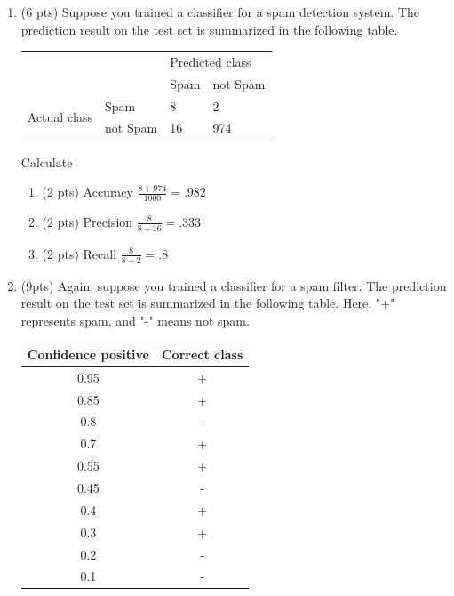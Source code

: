 \documentclass[a4paper]{article}
\theoremstyle{definition}
\newenvironment{soln}{
    \leavevmode\color{blue}\ignorespaces
}{}
\begin{document}
\begin{enumerate}
\begin{enumerate}
\end{enumerate}

\item (6 pts) Suppose you trained a classifier for a spam detection system. The prediction result on the test set is summarized in the following table.
\begin{center}
	\begin{tabular}{l l | l l}
		&          & \multicolumn{2}{l}{Predicted class} \\
		&          & Spam           & not Spam           \\
		\hline
		\multirow{2}{*}{Actual class} & Spam     & 8              & 2                  \\
		& not Spam & 16             & 974               
	\end{tabular}
\end{center}

Calculate
\begin{enumerate}
	\item (2 pts) Accuracy
	\begin{soln}  $\frac{8 + 974}{1000} = .982$ \end{soln}
	\item (2 pts) Precision
	\begin{soln}  $\frac{8}{8 + 16} = .333$ \end{soln}
	\item (2 pts) Recall
	\begin{soln}  $\frac{8}{8 + 2} = .8$ \end{soln}
\end{enumerate}


\item (9pts) Again, suppose you trained a classifier for a spam filter. The prediction result on the test set is summarized in the following table. Here, "+" represents spam, and "-" means not spam.

\begin{center}
\begin{tabular}{ c  c }
\hline
Confidence positive & Correct class \\ \hline
0.95 & + \\
0.85 & + \\
0.8 & - \\
0.7 & + \\
0.55 & + \\
0.45 & - \\
0.4 & + \\
0.3 & + \\
0.2 & - \\
0.1 & - \\
\hline
\end{tabular}
\end{center}


\end{enumerate}
\end{document}
